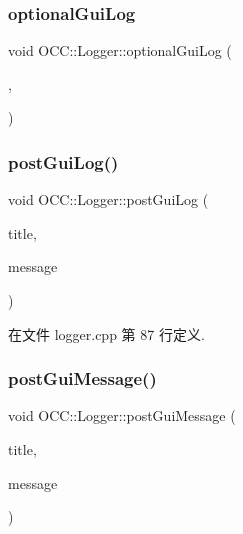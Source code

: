 \subsubsection{\texorpdfstring{optional\+Gui\+Log}{optionalGuiLog}}
{\footnotesize\ttfamily void O\+C\+C\+::\+Logger\+::optional\+Gui\+Log (\begin{DoxyParamCaption}\item[{const Q\+String \&}]{,  }\item[{const Q\+String \&}]{ }\end{DoxyParamCaption})\hspace{0.3cm}{\ttfamily [signal]}}

\mbox{\label{class_o_c_c_1_1_logger_a818eb7c51ba7e41eef13eeb0bcec5237}} 
\subsubsection{\texorpdfstring{post\+Gui\+Log()}{postGuiLog()}}
{\footnotesize\ttfamily void O\+C\+C\+::\+Logger\+::post\+Gui\+Log (\begin{DoxyParamCaption}\item[{const Q\+String \&}]{title,  }\item[{const Q\+String \&}]{message }\end{DoxyParamCaption})}



在文件 logger.\+cpp 第 87 行定义.

\mbox{\label{class_o_c_c_1_1_logger_aec60f119d20c0b00b7b94a089f50c75a}} 
\subsubsection{\texorpdfstring{post\+Gui\+Message()}{postGuiMessage()}}
{\footnotesize\ttfamily void O\+C\+C\+::\+Logger\+::post\+Gui\+Message (\begin{DoxyParamCaption}\item[{const Q\+String \&}]{title,  }\item[{const Q\+String \&}]{message }\end{DoxyParamCaption})}



